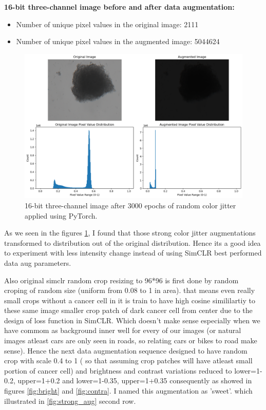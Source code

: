   \textbf{16-bit three-channel image before and after data augmentation:}
  \begin{itemize}
    \item Number of unique pixel values in the original image: 2111
    \item Number of unique pixel values in the augmented image: 5044624
  \end{itemize}
  
  \begin{figure}[H]
    \centering
    \includegraphics[scale=0.5]{figures/16bit_three_1.png} 
    \caption{16-bit three-channel image after 3000 epochs of random color jitter applied using PyTorch.}
    \label{fig:16bit_three_v1}
  \end{figure}
   

As we seen in the figures  \ref{fig:16bit_three_v1}, I found that those strong color jitter augmentations transformed to 
distribution out of the original distribution. Hence its a good idea to experiment with less intensity change instead of using SimCLR best performed data aug parameters.

Also original simclr random crop resizing to 96*96 is first done by random croping of random size (uniform from 0.08 to 1 in area). that means even really small 
crops without a cancer cell in it is train to have high cosine simililartiy to these same image smaller crop patch of dark cancer cell from center due to the design
 of  loss function in SimCLR. Which doesn't make sense especially when we have commom as background inner well for every of our images (or natural images atleast cars are only seen in roads, so 
 relating cars or bikes to road make sense). Hence the next data augmentation sequence designed to have random crop with scale 0.4 to 1 ( so that 
 assuming crop patches will have atleast small portion of cancer cell) and brightness and contrast variations reduced to lower=1-0.2, upper=1+0.2 and lower=1-0.35,
  upper=1+0.35 consequently as showed in figures  \ref{fig:bright} and  \ref{fig:contra}. I named this augmentation as 'sweet'. which illustrated in \ref{fig:strong_aug} second row.

